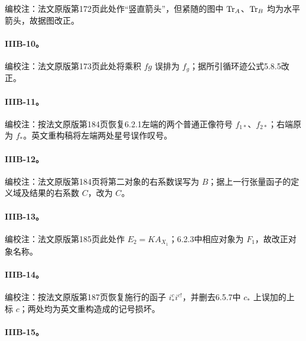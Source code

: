 编校注：法文原版第172页此处作“竖直箭头”，但紧随的图中 $\operatorname{Tr}_A$、$\operatorname{Tr}_B$ 均为水平箭头，故据图改正。

\hypertarget{collation-IIIB-10}{}

\paragraph*{IIIB-10。}

编校注：法文原版第173页此处将乘积 $fg$ 误排为 $f_g$；据所引循环迹公式5.8.5改正。

\hypertarget{collation-IIIB-11}{}

\paragraph*{IIIB-11。}

编校注：按法文原版第184页恢复6.2.1左端的两个普通正像符号 $f_{1*}$、$f_{2*}$；右端原为 $f_*$。英文重构稿将左端两处星号误作叹号。

\hypertarget{collation-IIIB-12}{}

\paragraph*{IIIB-12。}

编校注：法文原版第184页将第二对象的右系数误写为 $B$；据上一行张量函子的定义域及结果的右系数 $C$，改为 $C$。

\hypertarget{collation-IIIB-13}{}

\paragraph*{IIIB-13。}

编校注：法文原版第185页此处作 $E_2=KA_{X_1}$；6.2.3中相应对象为 $F_1$，故改正对象名称。

\hypertarget{collation-IIIB-14}{}

\paragraph*{IIIB-14。}

编校注：按法文原版第187页恢复施行的函子 $i_*^ci^{c!}$，并删去6.5.7中 $c_*$ 上误加的上标 $c$；两处均为英文重构造成的记号损坏。

\hypertarget{collation-IIIB-15}{}

\paragraph*{IIIB-15。}

